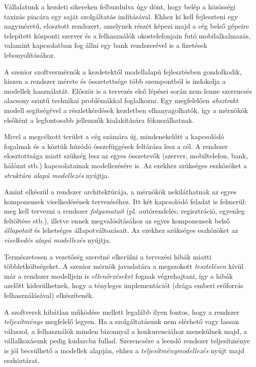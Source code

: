 \begin{pelda}
	Vállalatunk a kezdeti sikereken felbuzdulva úgy dönt, hogy belép a közösségi taxizás piacára egy saját szolgáltatás indításával. Ehhez ki kell fejleszteni egy nagyméretű, elosztott rendszert, amelynek részét képezi majd a cég belső gépeire telepített központi szerver és a felhasználók okostelefonjain futó mobilalkalmazás, valamint kapcsolatban fog állni egy bank rendszerével is a fizetések lebonyolításához.
	
	A szenior szoftvermérnök a kezdetektől modellalapú fejlesztésben gondolkodik, hiszen a rendszer mérete és összetettsége több szempontból is indokolja a modellek használatát. Először is a tervezés első lépései során nem lenne szerencsés alacsony szintű technikai problémákkal foglalkozni. Egy megfelelően \emph{absztrakt} modell segítségével a részletkérdések kezdetben elhanyagolhatók, így a mérnökök elsőként a legfontosabb jellemzők kialakítására fókuszálhatnak.
	
	Mivel a megcélzott terület a cég számára új, mindenekelőtt a kapcsolódó fogalmak és a köztük húzódó összefüggések feltárása lesz a cél. A rendszer elosztottsága miatt szükség lesz az egyes összetevők (szerver, mobiltelefon, bank, hálózat stb.) kapcsolatainak modellezésére is. Az ezekhez szükséges eszközöket a \emph{struktúra alapú modellezés} nyújtja.
	
	Amint elkészül a rendszer architektúrája, a mérnökök nekiláthatnak az egyes komponensek viselkedésének tervezéséhez. Itt két kapcsolódó feladat is felmerül: meg kell tervezni a rendszer \emph{folyamatait} (pl. autórendelés, regisztráció, egyenleg feltöltése stb.), illetve ennek megvalósításához az egyes komponensek belső \emph{állapotait} és lehetséges állapotváltozásait. Az ezekhez szükséges eszközöket az \emph{viselkedés alapú modellezés} nyújtja.
	
	Természetesen a vezetőség szeretné elkerülni a tervezési hibák miatti többletköltségeket. A szenior mérnök javaslatára a megszokott \emph{tesztelésen} kívül már a rendszer modelljein is \emph{ellenőrzéseket} fognak végrehajtani, így a hibák azelőtt kiderülhetnek, hogy a tényleges implementációt (drága emberi erőforrás felhasználásával) elkészítenék.
	
	A szoftverek hibátlan működése mellett legalább ilyen fontos, hogy a rendszer \emph{teljesítménye} megfelelő legyen. Ha a szolgáltatásunk nem elérhető vagy lassan válaszol, a felhasználók minden bizonnyal a konkurenciához menekülnek majd, a vállalkozásunk pedig kudarcba fullad. Szerencsére a leendő rendszer teljesítménye is jól becsülhető a modellek alapján, ehhez a \emph{teljesítménymodellezés} nyújt majd eszköztárat.
	

\end{pelda}
